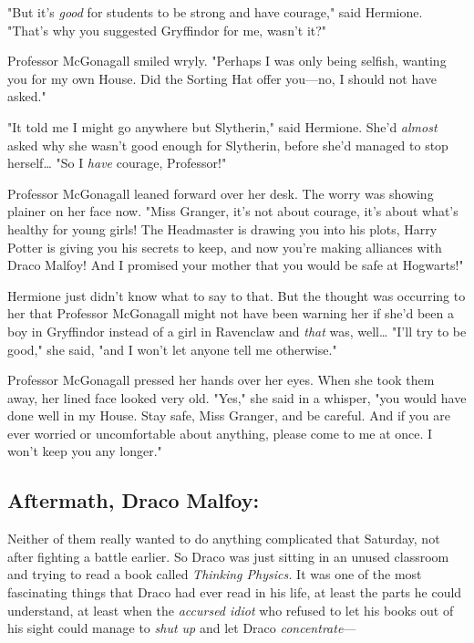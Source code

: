 "But it's \emph{good} for students to be strong and have courage," said 
Hermione. "That's why you suggested Gryffindor for me, wasn't it?"

Professor McGonagall smiled wryly. "Perhaps I was only being selfish, wanting 
you for my own House. Did the Sorting Hat offer you---no, I should not have 
asked."

"It told me I might go anywhere but Slytherin," said Hermione. She'd 
\emph{almost} asked why she wasn't good enough for Slytherin, before she'd 
managed to stop herself{\ldots} "So I \emph{have} courage, Professor!"

Professor McGonagall leaned forward over her desk. The worry was showing 
plainer on her face now. "Miss Granger, it's not about courage, it's about 
what's healthy for young girls! The Headmaster is drawing you into his plots, 
Harry Potter is giving you his secrets to keep, and now you're making alliances 
with Draco Malfoy! And I promised your mother that you would be safe at 
Hogwarts!"

Hermione just didn't know what to say to that. But the thought was occurring to 
her that Professor McGonagall might not have been warning her if she'd been a 
boy in Gryffindor instead of a girl in Ravenclaw and \emph{that} was, 
well{\ldots} "I'll try to be good," she said, "and I won't let anyone tell me 
otherwise."

Professor McGonagall pressed her hands over her eyes. When she took them away, 
her lined face looked very old. "Yes," she said in a whisper, "you would have 
done well in my House. Stay safe, Miss Granger, and be careful. And if you are 
ever worried or uncomfortable about anything, please come to me at once. I 
won't keep you any longer."
\sbreak
\vspace{-2\baselineskip}
\subsection{Aftermath, Draco Malfoy:}

Neither of them really wanted to do anything complicated that Saturday, not 
after fighting a battle earlier. So Draco was just sitting in an unused 
classroom and trying to read a book called \emph{Thinking Physics.} It was one 
of the most fascinating things that Draco had ever read in his life, at least 
the parts he could understand, at least when the \emph{accursed idiot} who 
refused to let his books out of his sight could manage to \emph{shut up} and 
let Draco \emph{concentrate}---

